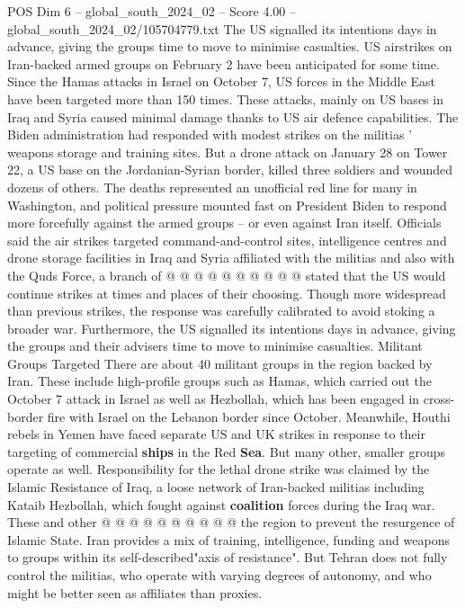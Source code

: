 \begin{textsample}{POS Dim 6 – global\_south\_2024\_02 – Score 4.00 – global\_south\_2024\_02/105704779.txt}  \label{ex:f6_pos_187}
The US signalled its intentions days in advance, giving the groups time to move to minimise casualties.
US airstrikes on Iran-backed armed groups on February 2 have been anticipated for some time.
Since the Hamas attacks in Israel on October 7, US forces in the Middle East have been targeted more than 150 times.
These attacks, mainly on US bases in Iraq and Syria caused minimal damage thanks to US air defence capabilities.
The Biden administration had responded with modest strikes on the militias ' weapons storage and training sites.
But a drone attack on January 28 on Tower 22, a US base on the Jordanian-Syrian border, killed three soldiers and wounded dozens of others.
The deaths represented an unofficial red line for many in Washington, and political pressure mounted fast on President Biden to respond more forcefully against the armed groups -- or even against Iran itself.
Officials said the air strikes targeted command-and-control sites, intelligence centres and drone storage facilities in Iraq and Syria affiliated with the militias and also with the Quds Force, a branch of @ @ @ @ @ @ @ @ @ @ stated that the US would continue strikes at times and places of their choosing.
Though more widespread than previous strikes, the response was carefully calibrated to avoid stoking a broader war.
Furthermore, the US signalled its intentions days in advance, giving the groups and their advisers time to move to minimise casualties.
Militant Groups Targeted There are about 40 militant groups in the region backed by Iran.
These include high-profile groups such as Hamas, which carried out the October 7 attack in Israel as well as Hezbollah, which has been engaged in cross-border fire with Israel on the Lebanon border since October.
Meanwhile, Houthi rebels in Yemen have faced separate US and UK strikes in response to their targeting of commercial \textbf{ships} in the Red \textbf{Sea}.
But many other, smaller groups operate as well.
Responsibility for the lethal drone strike was claimed by the Islamic Resistance of Iraq, a loose network of Iran-backed militias including Kataib Hezbollah, which fought against \textbf{coalition} forces during the Iraq war.
These and other @ @ @ @ @ @ @ @ @ @ the region to prevent the resurgence of Islamic State.
Iran provides a mix of training, intelligence, funding and weapons to groups within its self-described"axis of resistance".
But Tehran does not fully control the militias, who operate with varying degrees of autonomy, and who might be better seen as affiliates than proxies.

\end{textsample}
